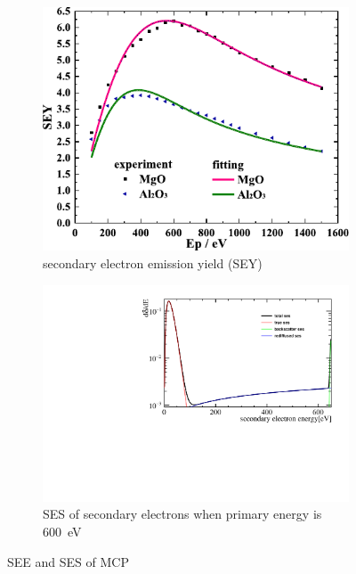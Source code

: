 \documentclass{article}
\begin{document}
\begin{figure}[htbp]
    \centering
    \begin{subfigure}[b]{0.45\textwidth}
        \includegraphics[width=\textwidth]{pic/SEE.pdf}
        \caption{secondary electron emission yield (SEY)}
        \label{fig:SEY}
    \end{subfigure}
    \begin{subfigure}[b]{0.45\textwidth}
        \includegraphics[width=\textwidth]{pic/SES.pdf}
        \caption{SES of secondary electrons when primary energy is \SI{600}{eV}}
        \label{fig:SES}
    \end{subfigure}
    \caption{SEE and SES of MCP}
    \label{fig:secondaryelectron}
\end{figure}
\end{document}
